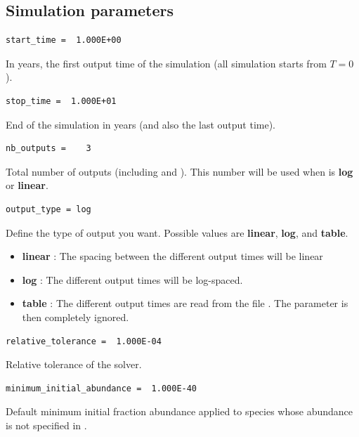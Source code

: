 \documentclass[english,a4paper,twoside]{article}
\begin{document}
\subsection{Simulation parameters}
\begin{verbatim}
start_time =  1.000E+00
\end{verbatim}
In years, the first output time of the simulation (all simulation starts from $T=0$).

\begin{verbatim}
stop_time =  1.000E+01
\end{verbatim}
End of the simulation in years (and also the last output time).

\begin{verbatim}
nb_outputs =    3
\end{verbatim}
Total number of outputs (including  and ). This number will be used when  is \textbf{log} or \textbf{linear}.

\begin{verbatim}
output_type = log
\end{verbatim}
Define the type of output you want. Possible values are \textbf{linear}, \textbf{log}, and \textbf{table}. 
\begin{itemize}
\item \textbf{linear} : The spacing between the different output times will be linear
\item \textbf{log} : The different output times will be log-spaced.
\item \textbf{table} : The different output times are read from the file . The parameter  is then completely ignored.
\end{itemize}

\begin{verbatim}
relative_tolerance =  1.000E-04
\end{verbatim}
Relative tolerance of the solver.

\begin{verbatim}
minimum_initial_abundance =  1.000E-40
\end{verbatim}
Default minimum initial fraction abundance applied to species whose abundance is not specified in .
\end{document}
